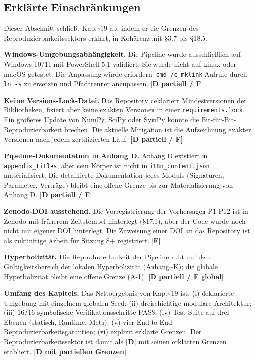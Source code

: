 ﻿\documentclass[11pt,letterpaper]{article}
\begin{document}
\subsection{Erklärte Einschränkungen}
Dieser Abschnitt schließt Kap.\textasciitilde{}19 ab, indem er die Grenzen des Reproduzierbarkeitssektors erklärt, in Kohärenz mit §3.7 bis §18.5.

\textbf{Windows-Umgebungsabhängigkeit.} Die Pipeline wurde ausschließlich auf Windows 10/11 mit PowerShell 5.1 validiert. Sie wurde nicht auf Linux oder macOS getestet. Die Anpassung würde erfordern, \texttt{cmd /c mklink}-Aufrufe durch \texttt{ln -s} zu ersetzen und Pfadtrenner anzupassen. \textbf{[D partiell / F]}

\textbf{Keine Versions-Lock-Datei.} Das Repository deklariert Mindestversionen der Bibliotheken, fixiert aber keine exakten Versionen in einer \texttt{requirements.lock}. Ein größeres Update von NumPy, SciPy oder SymPy könnte die Bit-für-Bit-Reproduzierbarkeit brechen. Die aktuelle Mitigation ist die Aufzeichnung exakter Versionen nach jedem zertifizierten Lauf. \textbf{[D partiell / F]}

\textbf{Pipeline-Dokumentation in Anhang D.} Anhang D existiert in \texttt{appendix\_titles}, aber sein Körper ist nicht in \texttt{i18n\_content.json} materialisiert. Die detaillierte Dokumentation jedes Moduls (Signaturen, Parameter, Verträge) bleibt eine offene Grenze bis zur Materialisierung von Anhang D. \textbf{[D partiell / F]}

\textbf{Zenodo-DOI ausstehend.} Die Vorregistrierung der Vorhersagen P1-P12 ist in Zenodo mit früherem Zeitstempel hinterlegt (§17.1), aber der Code wurde noch nicht mit eigener DOI hinterlegt. Die Zuweisung einer DOI an das Repository ist als zukünftige Arbeit für Sitzung 8+ registriert. \textbf{[F]}

\textbf{Hyperbolizität.} Die Reproduzierbarkeit der Pipeline ruht auf dem Gültigkeitsbereich der lokalen Hyperbolizität (Anhang\textasciitilde{}K); die globale Hyperbolizität bleibt eine offene Grenze (A-1). \textbf{[D partiell / F global]}

\textbf{Umfang des Kapitels.} Das Nettoergebnis von Kap.\textasciitilde{}19 ist: (i) deklarierte Umgebung mit einzelnem globalen Seed; (ii) dreischichtige modulare Architektur; (iii) 16/16 symbolische Verifikationsschritte PASS; (iv) Test-Suite auf drei Ebenen (statisch, Runtime, Meta); (v) vier End-to-End-Reproduzierbarkeitsgarantien; (vi) explizit erklärte Grenzen. Der Reproduzierbarkeitssektor ist damit als \textbf{[D]} mit seinen erklärten Grenzen etabliert. \textbf{[D mit partiellen Grenzen]}
\end{document}
